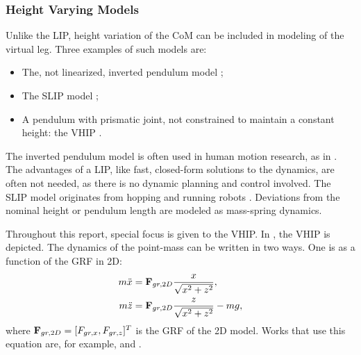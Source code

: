 \subsubsection{Height Varying Models} 
Unlike the \ac{LIP}, height variation of the \ac{CoM} can be included in modeling of the virtual leg. Three examples of such models are:
\begin{itemize}
	\item The, not linearized, inverted pendulum model \cite{kuo2005energetic};
	\item The \ac{SLIP} model \cite{liu2015trajectory};
	\item A pendulum with prismatic joint, not constrained to maintain a constant height: the \ac{VHIP} \cite{pratt2007derivation}.
\end{itemize}
The inverted pendulum model is often used in human motion research, as in \cite{kuo2005energetic}. The advantages of a \ac{LIP}, like fast, closed-form solutions to the dynamics, are often not needed, as there is no dynamic planning and control involved. The \ac{SLIP} model originates from hopping and running robots \cite{schwind1998spring}. Deviations from the nominal height or pendulum length are modeled as mass-spring dynamics. 

Throughout this report, special focus is given to the \ac{VHIP}. In , the \ac{VHIP} is depicted. The dynamics of the point-mass can be written in two ways. One is as a function of the \ac{GRF} in \ac{2D}:
\begin{align}
	m\ddot{x} &= \mathbf{F}_{gr,2D}\frac{x}{\sqrt{x^2 + z^2}},\\
	m\ddot{z} &= \mathbf{F}_{gr,2D}\frac{z}{\sqrt{x^2 + z^2}} - mg,
	\label{eq:dynamicsprattstyle}
\end{align}
where $\mathbf{F}_{gr,2D}=[F_{gr,x}, F_{gr,z}]^T$ is the \ac{GRF} of the \ac{2D}  model. Works that use this equation are, for example, \cite{pratt2007derivation} and \cite{koolen2016balance}.


